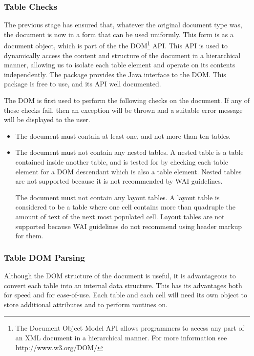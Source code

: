 \subsubsection{Table Checks}

The previous stage has ensured that, whatever the original document type was,
the document is now in a form that can be used uniformly. This form is as a
document object, which is part of the the DOM\footnote{The Document Object
Model API allows programmers to access any part of an XML document in a
hierarchical manner. For more information see http://www.w3.org/DOM/} API. 
This API is used to dynamically access the content and structure of the document in
a hierarchical manner, allowing us to isolate each table element and operate on
its contents independently. The  package provides the Java
interface to the DOM. This package is free to use, and its API well documented.

The DOM is first used to perform the following checks on the document. If any of
these checks fail, then an exception will be thrown and a suitable error
message will be displayed to the user.

\begin{itemize}

\item The document must contain at least one, and not more than ten tables.

\item The document must not contain any nested tables. A nested table is a
table contained inside another table, and is tested for by checking each table
element for a DOM descendant which is also a table element.  Nested tables are
not supported because it is not recommended by WAI guidelines.

The document must not contain any layout tables. A layout table is considered to
be a table where one cell contains more than quadruple the amount of text of
the next most populated cell. Layout tables are not supported because WAI
guidelines do not recommend using header markup for them.

\end{itemize}

\subsubsection{Table DOM Parsing}

Although the DOM structure of the document is useful, it is advantageous to convert
each table into an internal data structure. This has its advantages both for
speed and for ease-of-use. Each table and each cell will need its own object to
store additional attributes and to perform routines on.

